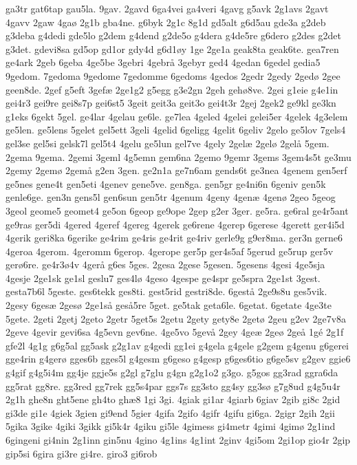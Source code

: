 {ga3tr
gat6tap
gau5la.
9gav.
2gavd
6ga4vei
ga4veri
4gavg
g5avk
2g1avs
2gavt
4gavv
2gaw
4gaø
2g1b
gba4ne.
g6byk
2g1c
8g1d
gd5alt
g6d5au
gde3a
g2deb
g3deba
g4dedi
gde5lo
g2dem
g4dend
g2de5o
g4dera
g4de5re
g6dero
g2des
g2det
g3det.
gdevi8sa
gd5op
gd1or
gdy4d
g6d1øy
1ge
2ge1a
geak8ta
geak6te.
gea7ren
ge4ark
2geb
6geba
4ge5be
3gebri
4gebrå
3gebyr
ged4
4gedan
6gedel
gedia5
9gedom.
7gedoma
9gedome
7gedomme
6gedoms
4gedos
2gedr
2gedy
2gedø
2gee
geen8de.
2gef
g5eft
3gefæ
2ge1g2
g5egg
g3e2gn
2geh
gehø8ve.
2gei
g1eie
g4e1in
gei4r3
gei9re
gei8s7p
gei6st5
3geit
geit3a
geit3o
gei4t3r
2gej
2gek2
ge9kl
ge3kn
g1eks
6gekt
5gel.
ge4lar
4gelau
ge6le.
ge7lea
4geled
4gelei
gelei5er
4gelek
4g3elem
ge5len.
ge5lens
5gelet
gel5ett
3geli
4gelid
6geligg
4gelit
6geliv
2gelo
ge5lov
7gels4
gel3se
gel5si
gelsk7l
gel5t4
4gelu
ge5lun
gel7ve
4gely
2gelæ
2gelø
2gelå
5gem.
2gema
9gema.
2gemi
3geml
4g5emn
gem6na
2gemo
9gemr
3gems
3gem4s5t
ge3mu
2gemy
2gemø
2gemå
g2en
3gen.
ge2n1a
ge7n6am
gends6t
ge3nea
4genem
gen5erf
ge5nes
gene4t
gen5eti
4genev
gene5ve.
gen8ga.
gen5gr
ge4ni6n
6geniv
gen5k
genle6ge.
gen3n
gens5l
gen6sun
gen5tr
4genum
4geny
4genæ
4genø
2geo
5geog
3geol
geome5
geomet4
ge5on
6geop
ge9ope
2gep
g2er
3ger.
ge5ra.
ge6ral
ge4r5ant
ge9ras
ger5di
4gered
4geref
4gereg
4gerek
ge6rene
4gerep
6gerese
4gerett
ger4i5d
4gerik
geri8ka
6gerike
ge4rim
ge4ris
ge4rit
ge4riv
gerle9g
g9er8ma.
ger3n
gerne6
4geroa
4gerom.
4geromm
6gerop.
4gerope
ger5p
ger4s5af
5gerud
ge5rup
ger5v
gerø6re.
ge4r3ø4v
4gerå
g6es
5ges.
2gesa
2gese
5gesen.
5gesens
4gesi
4ge5sja
4gesje
2ge1sk
ge1sl
geslu7
ges4lø
4geso
4gespe
ge4spr
ge5spra
2ge1st
3gest.
gesta7b6l
5geste.
ges6tekk
ges8ti.
gest5rid
gestri8de.
6gestå
2ge9s8u
ges5vik.
2gesy
6gesæ
2gesø
2ge1så
geså5re
5get.
ge5tak
geta6le.
6getat.
6getate
4ge3te
5gete.
2geti
2getj
2geto
2getr
5get5s
2getu
2gety
gety8e
2getø
2geu
g2ev
2ge7v8a
2geve
4gevir
gevi6sa
4g5evn
gev6ne.
4ge5vo
5gevå
2gey
4geæ
2geø
2geå
1gé
2g1f
gfe2l
4g1g
g6g5al
gg5ask
g2g1av
g4gedi
gg1ei
g4gela
g4gele
g2gem
g4genu
g6gerei
gge4rin
g4gerø
gges6b
gges5l
g4gesm
g6geso
g4gesp
g6ges6tio
g6ge5sv
g2gev
ggie6
g4gif
g4g5i4m
gg4je
ggje5s
g2gl
g7glu
g4gn
g2g1o2
g3go.
g5gos
gg3rad
ggra6da
gg5rat
gg8re.
gg3red
gg7rek
gg5s4par
ggs7s
gg3sto
gg4sy
gg3sø
g7g8ud
g4g5u4r
2g1h
ghe8n
ght5ene
gh4to
ghæ8
1gi
3gi.
4giak
gi1ar
4giarb
6giav
2gib
gi8c
2gid
gi3de
gi1e
4giek
3gien
gi9end
5gier
4gifa
2gifo
4gifr
4gifu
gi6ga.
2gigr
2gih
2gii
5gika
3gike
4giki
3gikk
gi5k4r
4giku
gi5le
4gimess
gi4metr
4gimi
4gimø
2g1ind
6gingeni
gi4nin
2g1inn
gin5nu
4gino
4g1ins
4g1int
2ginv
4gi5om
2gi1op
gio4r
2gip
gip5si
6gira
gi3re
gi4re.
giro3
gi6rob
}
